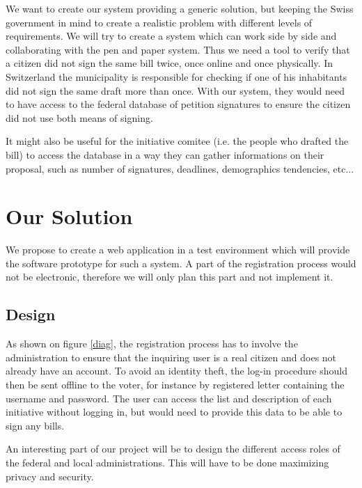 \documentclass[12pt,letter,titlepage]{article}
\begin{document}
We want to create our system providing a generic solution, but keeping the Swiss government in mind to create a realistic problem with different levels of requirements. We will try to create a system which can work side by side and collaborating with the pen and paper system. Thus we need a tool to verify that a citizen did not sign the same bill twice, once online and once physically. In Switzerland the municipality is responsible for checking if one of his inhabitants did not sign the same draft more than once. With our system, they would need to have access to the federal database of petition signatures to ensure the citizen did not use both means of signing.

It might also be useful for the initiative comitee (i.e. the people who drafted the bill) to access the database in a way they can gather informations on their proposal, such as number of signatures, deadlines, demographics tendencies, etc...


\section{Our Solution}
We propose to create a web application in a test environment which will provide the software prototype for such a system. A part of the registration process would not be electronic, therefore we will only plan this part and not implement it.

\subsection{Design}
As shown on figure \ref{diag}, the registration process has to involve the administration to ensure that the inquiring user is a real citizen and does not already have an account. To avoid an identity theft, the log-in procedure should then be sent offline to the voter, for instance by registered letter containing the username and password. The user can access the list and description of each initiative without logging in, but would need to provide this data to be able to sign any bills.

An interesting part of our project will be to design the different access roles of the federal and local administrations. This will have to be done maximizing privacy and security.
\end{document}
